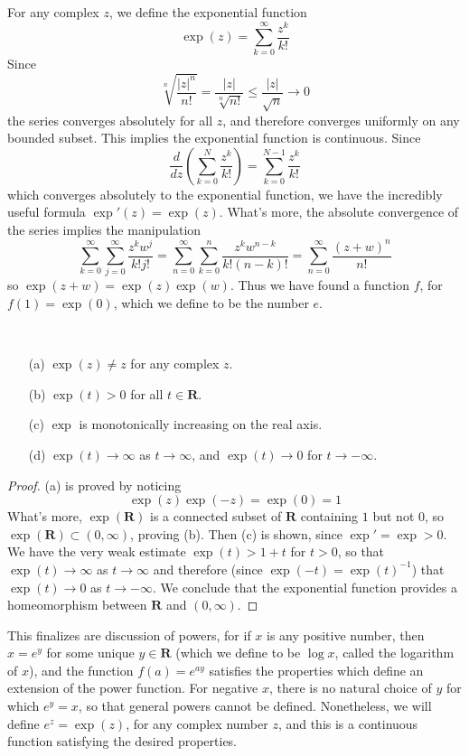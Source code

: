 For any complex $z$, we define the exponential function
%
\[ \exp(z) = \sum_{k = 0}^\infty \frac{z^k}{k!} \]
%
Since
%
\[ \sqrt[n]{\frac{|z|^n}{n!}} = \frac{|z|}{\sqrt[n]{n!}} \leq \frac{|z|}{\sqrt{n}} \to 0 \]
%
the series converges absolutely for all $z$, and therefore converges uniformly on any bounded subset. This implies the exponential function is continuous. Since
%
\[ \frac{d}{dz} \left( \sum_{k = 0}^N \frac{z^k}{k!} \right) = \sum_{k = 0}^{N-1} \frac{z^k}{k!} \]
%
which converges absolutely to the exponential function, we have the incredibly useful formula $\exp'(z) = \exp(z)$. What's more, the absolute convergence of the series implies the manipulation
%
\[ \sum_{k = 0}^\infty \sum_{j = 0}^\infty \frac{z^k w^j}{k! j!} = \sum_{n = 0}^\infty \sum_{k = 0}^n \frac{z^k w^{n-k}}{k! (n-k)!} = \sum_{n = 0}^\infty \frac{(z + w)^n}{n!} \]
%
so $\exp(z+w) = \exp(z) \exp(w)$. Thus we have found a function $f$, for $f(1) = \exp(0)$, which we define to be the number $e$.

\begin{theorem}
    \ 
    \begin{enumerate}
        \item[(a)] $\exp(z) \neq z$ for any complex $z$.
        \item[(b)] $\exp(t) > 0$ for all $t \in \mathbf{R}$.
        \item[(c)] $\exp$ is monotonically increasing on the real axis.
        \item[(d)] $\exp(t) \to \infty$ as $t \to \infty$, and $\exp(t) \to 0$ for $t \to -\infty$.
    \end{enumerate}
\end{theorem}
\begin{proof}
    (a) is proved by noticing
    \[ \exp(z) \exp(-z) = \exp(0) = 1 \]
    What's more, $\exp(\mathbf{R})$ is a connected subset of $\mathbf{R}$ containing $1$ but not $0$, so $\exp(\mathbf{R}) \subset (0,\infty)$, proving (b). Then (c) is shown, since $\exp' = \exp > 0$. We have the very weak estimate $\exp(t) > 1 + t$ for $t > 0$, so that $\exp(t) \to \infty$ as $t \to \infty$ and therefore (since $\exp(-t) = \exp(t)^{-1}$) that $\exp(t) \to 0$ as $t \to - \infty$. We conclude that the exponential function provides a homeomorphism between $\mathbf{R}$ and $(0,\infty)$.
\end{proof}

This finalizes are discussion of powers, for if $x$ is any positive number, then $x = e^y$ for some unique $y \in \mathbf{R}$ (which we define to be $\log x$, called the logarithm of $x$), and the function $f(a) = e^{ay}$ satisfies the properties which define an extension of the power function. For negative $x$, there is no natural choice of $y$ for which $e^y = x$, so that general powers cannot be defined. Nonetheless, we will define $e^z = \exp(z)$, for any complex number $z$, and this is a continuous function satisfying the desired properties.

